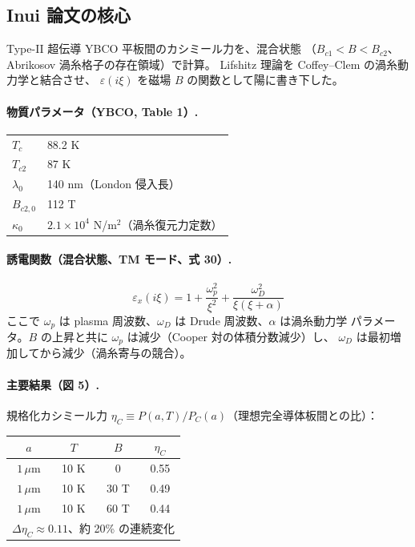 \documentclass[11pt,a4paper]{article}
\def\textbf#1{#1}%
\begin{document}
\subsection{Inui 論文の核心}

Type-II 超伝導 YBCO 平板間のカシミール力を、混合状態
（$B_{c1} < B < B_{c2}$、Abrikosov 渦糸格子の存在領域）で計算。
Lifshitz 理論を Coffey--Clem の渦糸動力学と結合させ、
$\varepsilon(i\xi)$ を磁場 $B$ の関数として陽に書き下した。

\paragraph{物質パラメータ（YBCO, Table 1）.}
\begin{center}
\begin{tabular}{ll}
\toprule
$T_c$        & 88.2 K \\
$T_{c2}$     & 87 K \\
$\lambda_0$  & 140 nm（London 侵入長）\\
$B_{c2,0}$   & 112 T \\
$\kappa_0$   & $2.1\times 10^4$ N/m$^2$（渦糸復元力定数）\\
\bottomrule
\end{tabular}
\end{center}

\paragraph{誘電関数（混合状態、TM モード、式 30）.}
\[
  \varepsilon_x(i\xi) = 1 + \frac{\omega_p^2}{\xi^2} + \frac{\omega_D^2}{\xi(\xi+\alpha)}
\]
ここで $\omega_p$ は plasma 周波数、$\omega_D$ は Drude 周波数、$\alpha$ は渦糸動力学
パラメータ。$B$ の上昇と共に $\omega_p$ は減少（Cooper 対の体積分数減少）し、
$\omega_D$ は最初増加してから減少（渦糸寄与の競合）。

\paragraph{主要結果（図 5）.}
規格化カシミール力 $\eta_C \equiv P(a,T)/P_C(a)$（理想完全導体板間との比）：

\begin{center}
\begin{tabular}{cccc}
\toprule
$a$ & $T$ & $B$ & $\eta_C$ \\
\midrule
$1\,\mu$m & 10 K & 0  & 0.55 \\
$1\,\mu$m & 10 K & 30 T & 0.49 \\
$1\,\mu$m & 10 K & 60 T & 0.44 \\
\midrule
\multicolumn{4}{l}{$\Delta\eta_C \approx 0.11$、約 \textbf{20\% の連続変化}} \\
\bottomrule
\end{tabular}
\end{center}
\end{document}
